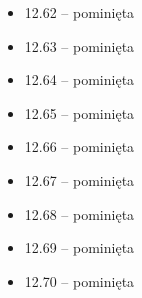 \begin{multicols}{3}
\begin{itemize}
    \item 12.62 -- pominięta
    \item 12.63 -- pominięta
    \item 12.64 -- pominięta
    \item 12.65 -- pominięta
    \item 12.66 -- pominięta
    \item 12.67 -- pominięta
    \item 12.68 -- pominięta
    \item 12.69 -- pominięta
    \item 12.70 -- pominięta

\end{itemize}
\end{multicols}
